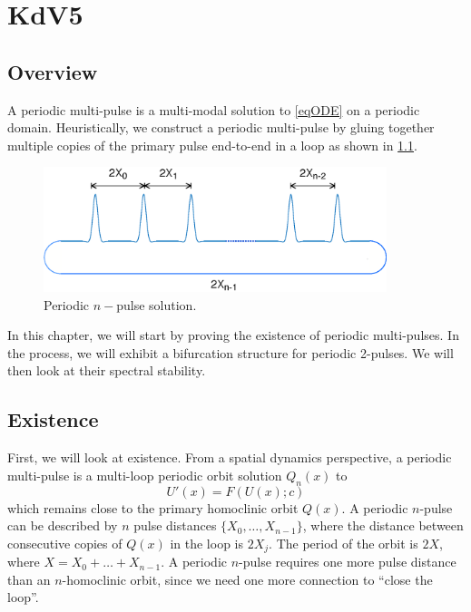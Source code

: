 \documentclass[thesis.tex]{subfiles}
\begin{document}
\iffulldocument\else
	\chapter{KdV5}
\fi

\section{Overview}

A periodic multi-pulse is a multi-modal solution to \cref{eqODE} on a periodic domain. Heuristically, we construct a periodic multi-pulse by gluing together multiple copies of the primary pulse end-to-end in a loop as shown in \cref{fig:permultipulse}.
\begin{figure}
\includegraphics[width=10cm]{periodic/multipulseperiodic}
\caption{Periodic $n-$pulse solution.}
\label{fig:permultipulse}
\end{figure}

In this chapter, we will start by proving the existence of periodic multi-pulses. In the process, we will exhibit a bifurcation structure for periodic 2-pulses. We will then look at their spectral stability.

\section{Existence}\label{sec:perexist}

First, we will look at existence. From a spatial dynamics perspective, a periodic multi-pulse is a multi-loop periodic orbit solution $Q_n(x)$ to
\begin{equation}\label{existgenODE}
U'(x) = F(U(x); c)
\end{equation}
which remains close to the primary homoclinic orbit $Q(x)$. A periodic $n$-pulse can be described by $n$ pulse distances $\{X_0, \dots, X_{n-1} \}$, where the distance between consecutive copies of $Q(x)$ in the loop is $2 X_j$. The period of the orbit is $2X$, where $X = X_0 + \dots + X_{n-1}$. A periodic $n$-pulse requires one more pulse distance than an $n$-homoclinic orbit, since we need one more connection to ``close the loop''.  
\end{document}
